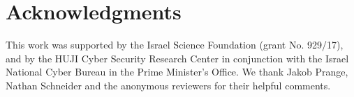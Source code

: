 \documentclass[11pt,a4paper,table]{article}
\begin{document}
\section*{Acknowledgments}

This work was supported by the Israel Science Foundation (grant No. 929/17),
and by the HUJI Cyber Security Research Center
in conjunction with the Israel National Cyber Bureau in the Prime Minister's Office.
We thank Jakob Prange, Nathan Schneider
and the anonymous reviewers for their helpful comments.




\end{document}

